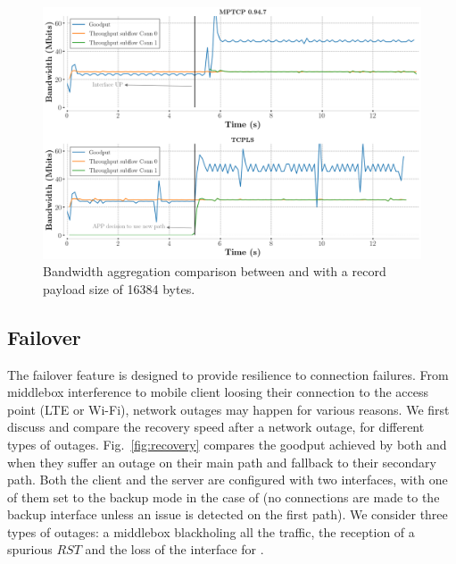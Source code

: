 \begin{figure}[!t]
  \begin{center}
    \includegraphics[width=\columnwidth]{figures/aggregate_dual.png}
  \end{center}
\vspace{-0.5cm}
  \caption{Bandwidth aggregation comparison between \mptcp and
    \tcpls with a record payload size of 16384 bytes.}
  \label{fig:multipath_aggregation}
\end{figure}

\subsection{Failover}
\label{sec:eval_failover}

The failover feature is designed to provide resilience to \tcpls connection
failures. From middlebox interference to mobile client loosing
their connection to the access point (LTE or Wi-Fi), network outages may happen
for various reasons. We first discuss and compare the recovery speed
after a network outage, for different types of outages. Fig.~\ref{fig:recovery}
compares the goodput achieved by both \mptcp and \tcpls when they suffer an
outage on their main path and fallback to their secondary path. Both the client and
the server are configured with two interfaces, with one of them set to the backup
mode in the case of \mptcp (no connections are made to the backup interface
unless an issue is detected on the first path). We consider three types of
outages: a middlebox blackholing all the traffic, the reception of a spurious
$RST$ and the loss of the interface for \mptcp.


